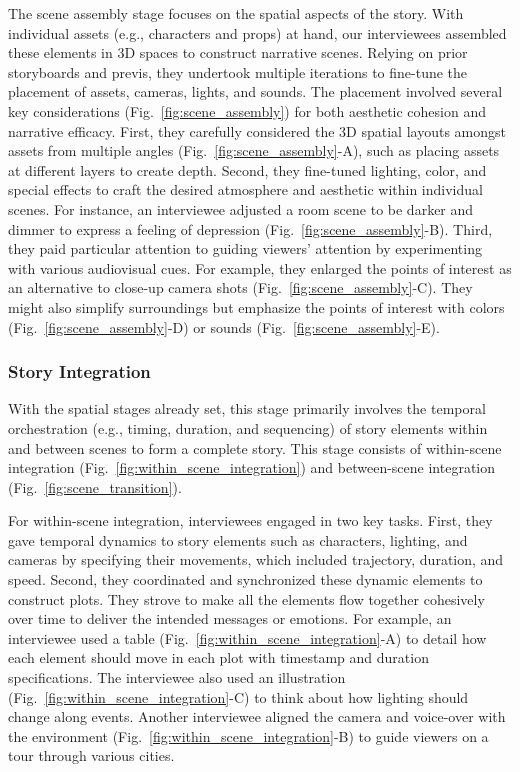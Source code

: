 The scene assembly stage focuses on the spatial aspects of the story. 
With individual assets (e.g., characters and props) at hand, our interviewees assembled these elements in 3D spaces to construct narrative scenes. Relying on prior storyboards and previs, they undertook multiple iterations to fine-tune the placement of assets, cameras, lights, and sounds. The placement involved several key considerations (Fig.~\ref{fig:scene_assembly}) for both aesthetic cohesion and narrative efficacy. 
First, they carefully considered the 3D spatial layouts amongst assets from multiple angles (Fig.~\ref{fig:scene_assembly}-A), such as placing assets at different layers to create depth. 
Second, they fine-tuned lighting, color, and special effects to craft the desired atmosphere and aesthetic within individual scenes. For instance, an interviewee adjusted a room scene to be darker and dimmer to express a feeling of depression (Fig.~\ref{fig:scene_assembly}-B). Third, they paid particular attention to guiding viewers' attention by experimenting with various audiovisual cues. For example, they enlarged the points of interest as an alternative to close-up camera shots (Fig.~\ref{fig:scene_assembly}-C). They might also simplify surroundings but emphasize the points of interest with colors (Fig.~\ref{fig:scene_assembly}-D) or sounds (Fig.~\ref{fig:scene_assembly}-E). 


\subsubsection{Story Integration}
\label{sec:story_integration}


With the spatial stages already set, this stage primarily involves the temporal orchestration (e.g., timing, duration, and sequencing) of story elements within and between scenes to form a complete story. This stage consists of within-scene integration (Fig.~\ref{fig:within_scene_integration}) and between-scene integration (Fig.~\ref{fig:scene_transition}).

For within-scene integration, interviewees engaged in two key tasks. First, they gave temporal dynamics to story elements such as characters, lighting, and cameras by specifying their movements, which included trajectory, duration, and speed. Second, they coordinated and synchronized these dynamic elements to construct plots. They strove to make all the elements flow together cohesively over time to deliver the intended messages or emotions. For example, an interviewee used a table (Fig.~\ref{fig:within_scene_integration}-A) to detail how each element should move in each plot with timestamp and duration specifications. The interviewee also used an illustration (Fig.~\ref{fig:within_scene_integration}-C) to think about how lighting should change along events. 
Another interviewee aligned the camera and voice-over with the environment (Fig.~\ref{fig:within_scene_integration}-B) to guide viewers on a tour through various cities.

